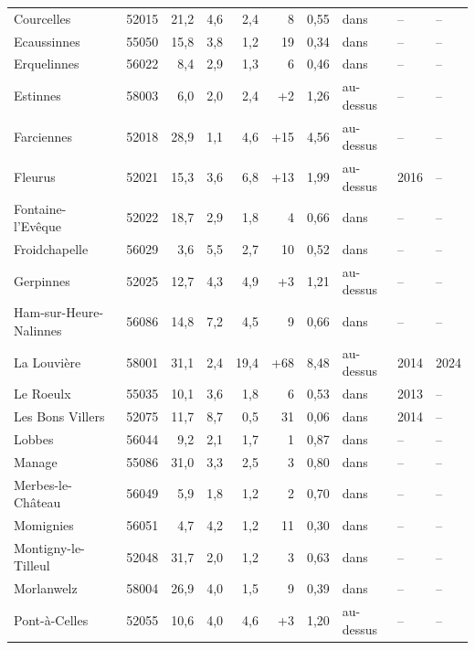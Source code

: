 \begin{longtable}{lrrrrrrlll}
Courcelles & 52015 & 21{,}2 & 4{,}6 & 2{,}4 & \textminus{}8 & 0{,}55 & dans & -- & -- \\
Ecaussinnes & 55050 & 15{,}8 & 3{,}8 & \textminus{}1{,}2 & \textminus{}19 & \textminus{}0{,}34 & dans & -- & -- \\
Erquelinnes & 56022 & 8{,}4 & 2{,}9 & 1{,}3 & \textminus{}6 & 0{,}46 & dans & -- & -- \\
Estinnes & 58003 & 6{,}0 & 2{,}0 & 2{,}4 & +2 & 1{,}26 & au-dessus & -- & -- \\
Farciennes & 52018 & 28{,}9 & 1{,}1 & 4{,}6 & +15 & 4{,}56 & au-dessus & -- & -- \\
Fleurus & 52021 & 15{,}3 & 3{,}6 & 6{,}8 & +13 & 1{,}99 & au-dessus & 2016 & -- \\
Fontaine-l'Evêque & 52022 & 18{,}7 & 2{,}9 & 1{,}8 & \textminus{}4 & 0{,}66 & dans & -- & -- \\
Froidchapelle & 56029 & 3{,}6 & 5{,}5 & 2{,}7 & \textminus{}10 & 0{,}52 & dans & -- & -- \\
Gerpinnes & 52025 & 12{,}7 & 4{,}3 & 4{,}9 & +3 & 1{,}21 & au-dessus & -- & -- \\
Ham-sur-Heure-Nalinnes & 56086 & 14{,}8 & 7{,}2 & 4{,}5 & \textminus{}9 & 0{,}66 & dans & -- & -- \\
La Louvière & 58001 & 31{,}1 & 2{,}4 & 19{,}4 & +68 & 8{,}48 & au-dessus & 2014 & 2024 \\
Le Roeulx & 55035 & 10{,}1 & 3{,}6 & 1{,}8 & \textminus{}6 & 0{,}53 & dans & 2013 & -- \\
Les Bons Villers & 52075 & 11{,}7 & 8{,}7 & 0{,}5 & \textminus{}31 & 0{,}06 & dans & 2014 & -- \\
Lobbes & 56044 & 9{,}2 & 2{,}1 & 1{,}7 & \textminus{}1 & 0{,}87 & dans & -- & -- \\
Manage & 55086 & 31{,}0 & 3{,}3 & 2{,}5 & \textminus{}3 & 0{,}80 & dans & -- & -- \\
Merbes-le-Château & 56049 & 5{,}9 & 1{,}8 & 1{,}2 & \textminus{}2 & 0{,}70 & dans & -- & -- \\
Momignies & 56051 & 4{,}7 & 4{,}2 & 1{,}2 & \textminus{}11 & 0{,}30 & dans & -- & -- \\
Montigny-le-Tilleul & 52048 & 31{,}7 & 2{,}0 & 1{,}2 & \textminus{}3 & 0{,}63 & dans & -- & -- \\
Morlanwelz & 58004 & 26{,}9 & 4{,}0 & 1{,}5 & \textminus{}9 & 0{,}39 & dans & -- & -- \\
Pont-à-Celles & 52055 & 10{,}6 & 4{,}0 & 4{,}6 & +3 & 1{,}20 & au-dessus & -- & -- \\

\end{longtable}
